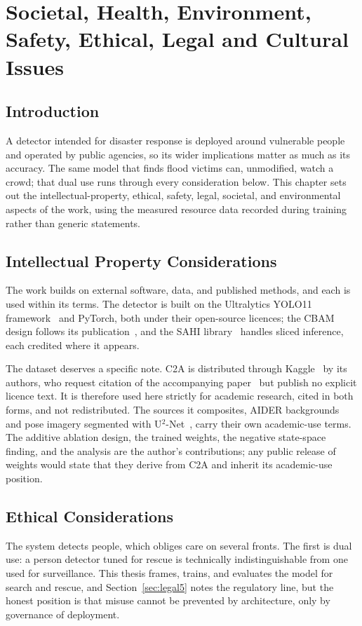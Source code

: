 \chapter{Societal, Health, Environment, Safety, Ethical, Legal and Cultural Issues}

\section{Introduction}
A detector intended for disaster response is deployed around vulnerable people
and operated by public agencies, so its wider implications matter as much as
its accuracy. The same model that finds flood victims can, unmodified, watch a
crowd; that dual use runs through every consideration below. This chapter sets
out the intellectual-property, ethical, safety, legal, societal, and
environmental aspects of the work, using the measured resource data recorded
during training rather than generic statements.

\section{Intellectual Property Considerations}
The work builds on external software, data, and published methods, and each is
used within its terms. The detector is built on the Ultralytics YOLO11
framework~\cite{jocher2024yolo11} and PyTorch, both under their open-source
licences; the CBAM design follows its publication~\cite{woo2018cbam}, and the
SAHI library~\cite{akyon2022sahi} handles sliced inference, each credited
where it appears.

The dataset deserves a specific note. C2A is distributed through
Kaggle~\cite{c2akaggle} by its authors, who request citation of the
accompanying paper~\cite{nihal2024c2a} but publish no explicit licence text.
It is therefore used here strictly for academic research, cited in both
forms, and not redistributed. The sources it composites, AIDER
backgrounds~\cite{kyrkou2020aider} and pose imagery segmented with
U$^2$-Net~\cite{qin2020u2net}, carry their own academic-use terms. The
additive ablation design, the trained weights, the negative state-space
finding, and the analysis are the author's contributions; any public release
of weights would state that they derive from C2A and inherit its
academic-use position.

\section{Ethical Considerations}
The system detects people, which obliges care on several fronts. The first is
dual use: a person detector tuned for rescue is technically indistinguishable
from one used for surveillance. This thesis frames, trains, and evaluates the
model for search and rescue, and Section~\ref{sec:legal5} notes the
regulatory line, but the honest position is that misuse cannot be prevented
by architecture, only by governance of deployment.

